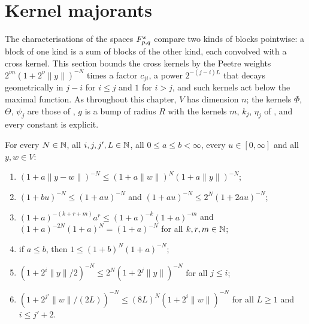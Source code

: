\section{Kernel majorants}

The characterisations of the spaces $F^{s}_{p,q}$ compare two kinds of blocks pointwise: a block of
one kind is a sum of blocks of the other kind, each convolved with a cross kernel. This section
bounds the cross kernels by the Peetre weights $2^{\nu n} (1 + 2^\nu \|y\|)^{-N}$ times a factor
$c_{ji}$, a power $2^{-(j-i)L}$ that decays geometrically in $j - i$ for $i \leq j$ and $1$ for
$i > j$, and such kernels act below the maximal function. As throughout this chapter, $V$ has
dimension $n$; the kernels $\Phi$, $\Theta$, $\psi_j$ are those of , $g$ is
a bump of radius $R$ with the kernels $m$, $k_j$, $\eta_j$ of , and every
constant is explicit.

\begin{lemma}
\label{lem:peetre-weights}
\leanok
For every $N \in \mathbb{N}$, all $i, j, j', L \in \mathbb{N}$, all $0 \leq a \leq b < \infty$, every
$u \in [0, \infty]$ and all $y, w \in V$:
\begin{enumerate}
  \item $(1 + a \|y - w\|)^{-N} \leq (1 + a \|w\|)^N (1 + a \|y\|)^{-N}$;
  \item $(1 + b u)^{-N} \leq (1 + a u)^{-N}$ and $(1 + a u)^{-N} \leq 2^N (1 + 2 a u)^{-N}$;
  \item $(1 + a)^{-(k + r + m)} a^r \leq (1 + a)^{-k} (1 + a)^{-m}$ and
    $(1 + a)^{-2N} (1 + a)^N = (1 + a)^{-N}$ for all $k, r, m \in \mathbb{N}$;
  \item if $a \leq b$, then $1 \leq (1 + b)^N (1 + a)^{-N}$;
  \item $(1 + 2^i \|y\| / 2)^{-N} \leq 2^N (1 + 2^j \|y\|)^{-N}$ for all $j \leq i$;
  \item $(1 + 2^{j'} \|w\| / (2 L))^{-N} \leq (8 L)^N (1 + 2^i \|w\|)^{-N}$ for all
    $L \geq 1$ and $i \leq j' + 2$.
\end{enumerate}
\end{lemma}

